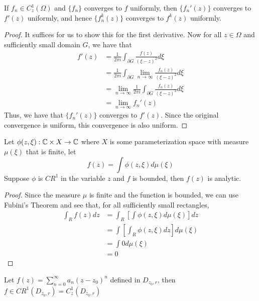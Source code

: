 \begin{corollary}
    If $f_n \in C_z^1(\Omega)$ and $\{f_n\}$ converges to $f$ uniformly, then $\{f_n'(z)\}$ converges to $f'(z)$ uniformly, and hence $\{f_n^{k}(z)\}$ converges to $f^{k}(z)$ uniformly.
\end{corollary}

\begin{proof}
It suffices for us to show this for the first derivative. Now for all $z \in \Omega$ and sufficiently small domain $G$, we have that
\begin{align*}
    f'(z) &= \frac{1}{2 \pi i} \int_{\partial G} \frac{f(z)}{(\xi - z)^2} d\xi \tag*{Cauchy's Formula for Derivatives}\\
    &= \frac{1}{2 \pi i} \int_{\partial G} \lim_{n \to \infty} \frac{f_n(z)}{(\xi - z)^2} d\xi\\
    &= \lim_{n \to \infty} \frac{1}{2 \pi i} \int_{\partial G} \frac{f_n(z)}{(\xi - z)^2} d\xi \tag*{Uniform Convergence}\\
    &= \lim_{n \to \infty} f_n'(z) \tag*{Cauchy's Formula for Derivatives}
\end{align*}
Thus, we have that $\{f_n'(z)\}$ converges to $f'(z)$. Since the original convergence is uniform, this convergence is also uniform.
\end{proof}

\begin{theorem}
    Let $\phi(z, \xi): \mathbb{C} \times X \to \mathbb{C}$ where $X$ is some parameterization space with measure $\mu(\xi)$ that is finite, let
    $$f(z) = \int \phi(z, \xi) d\mu(\xi)$$
    Suppose $\phi$ is $CR^1$ in the variable $z$ and $f$ is bounded, then $f(z)$ is analytic.
\end{theorem}

\begin{proof}
    Since the measure $\mu$ is finite and the function is bounded, we can use Fubini's Theorem and see that, for all sufficiently small rectangles,
    \begin{align*}
        \int_R f(z) dz &= \int_R [\int \phi(z, \xi) d\mu(\xi)] dz\\
        &= \int [\int_R \phi(z, \xi) dz] d\mu(\xi) \tag*{Fubini's Theorem}\\
        &= \int 0 d\mu(\xi) \tag*{$\phi$ is $CR^1$ in the variable $z$}\\
        &= 0
    \end{align*}
\end{proof}

\begin{corollary}
    Let $f(z) = \sum_{n = 0}^\infty a_n (z - z_0)^n$ defined in $D_{z_0, r}$, then $f \in CR^1(D_{z_0, r}) = C_z^1(D_{z_0, r})$
\end{corollary}

